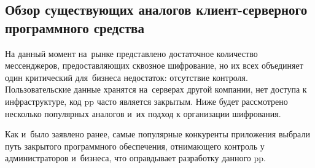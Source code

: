 \subsection{Обзор существующих аналогов клиент-серверного программного средства}
\label{sec:analysis:research:analogs}

На данный момент на~рынке представлено достаточное количество мессенджеров, предоставляющих сквозное шифрование, но их всех объединяет один критический для~бизнеса недостаток: отсутствие контроля. 
Пользовательские данные хранятся на~серверах другой компании, нет доступа к инфраструктуре, код \gls{pp} часто является закрытым. Ниже будет рассмотрено несколько популярных аналогов и~их подход к организации шифрования.




Как и~было заявлено ранее, самые популярные конкуренты приложения выбрали путь закрытого программного обеспечения, отнимающего контроль у администраторов и~бизнеса, что оправдывает разработку данного \gls{pp}.